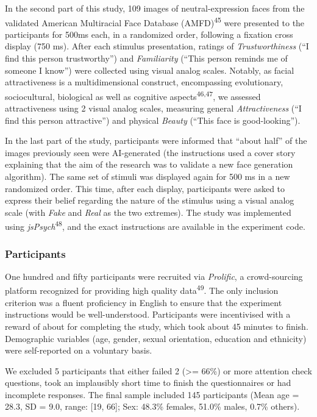\documentclass[
  man,floatsintext]{apa6}
\begin{document}
In the second part of this study, 109 images of neutral-expression faces from the validated American Multiracial Face Database
(AMFD)\textsuperscript{45}
were presented to the participants for 500ms each, in a randomized order, following a fixation cross display (750 ms). After each stimulus presentation, ratings of \emph{Trustworthiness} (``I find this person trustworthy'') and \emph{Familiarity} (``This person reminds me of someone I know'') were collected using visual analog scales. Notably, as facial attractiveness is a multidimensional construct, encompassing evolutionary, sociocultural, biological as well as cognitive aspects\textsuperscript{46,47}, we assessed attractiveness using 2 visual analog scales, measuring general \emph{Attractiveness} (``I find this person attractive'') and physical \emph{Beauty} (``This face is good-looking'').

In the last part of the study, participants were informed that ``about half'' of the images previously seen were AI-generated (the instructions used a cover story explaining that the aim of the research was to validate a new face generation algorithm). The same set of stimuli was displayed again for 500 ms in a new randomized order. This time, after each display, participants were asked to express their belief regarding the nature of the stimulus using a visual analog scale (with \emph{Fake} and \emph{Real} as the two extremes). The study was implemented using \emph{jsPsych}\textsuperscript{48}, and the exact instructions are available in the experiment code.

\hypertarget{participants}{%
\subsubsection{Participants}\label{participants}}

One hundred and fifty participants were recruited via \emph{Prolific}, a crowd-sourcing platform recognized for providing high quality data\textsuperscript{49}. The only inclusion criterion was a fluent proficiency in English to ensure that the experiment instructions would be well-understood. Participants were incentivised with a reward of about  for completing the study, which took about 45 minutes to finish. Demographic variables (age, gender, sexual orientation, education and ethnicity) were self-reported on a voluntary basis.

We excluded 5 participants that either failed 2 (\textgreater= 66\%) or more attention check questions, took an implausibly short time to finish the questionnaires or had incomplete responses. The final sample included 145 participants (Mean age = 28.3, SD = 9.0, range: {[}19, 66{]}; Sex: 48.3\% females, 51.0\% males, 0.7\% others).
\end{document}
